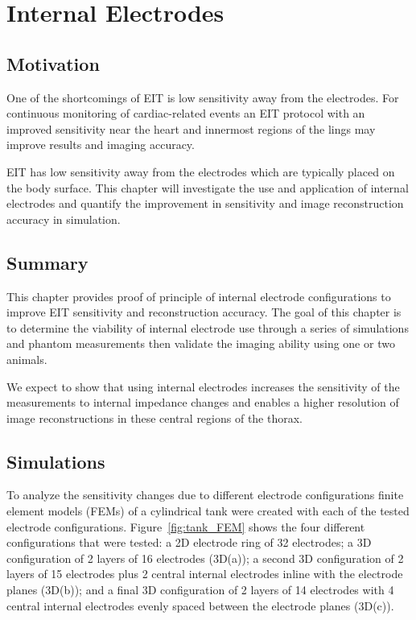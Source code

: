 \chapter{Internal Electrodes}

\section{Motivation}
One of the shortcomings of EIT is low sensitivity away from the electrodes. 
For continuous monitoring of cardiac-related events an EIT protocol with an improved sensitivity 
near the heart and innermost regions of the lings may improve results and imaging accuracy.

EIT has low sensitivity away from the electrodes which are typically placed on the body surface. 
This chapter will investigate the use and application of internal electrodes and quantify the improvement 
in sensitivity and image reconstruction accuracy in simulation.

\section{Summary}
This chapter provides proof of principle of internal electrode configurations to 
improve EIT sensitivity and reconstruction accuracy.
The goal of this chapter is to determine the viability of internal electrode use through a series of simulations and phantom measurements then validate
the imaging ability using one or two animals. 

We expect to show that using internal electrodes increases the sensitivity of the measurements to internal impedance changes 
and enables a higher resolution of image reconstructions in these central regions of the thorax. 

\section{Simulations}
To analyze the sensitivity changes due to different electrode 
configurations finite element models (FEMs) of a cylindrical tank were 
created with each of the tested electrode configurations. Figure~\ref{fig:tank_FEM} shows the four 
different configurations that were tested: a 2D 
electrode ring of 32 electrodes; a 3D configuration of 2 layers of 16 
electrodes (3D(a)); a second 3D configuration of 2 layers of 15 electrodes 
plus 2 central internal electrodes inline with the electrode planes (3D(b)); and a final 3D configuration of 
2 layers of 14 electrodes with 4 central internal electrodes evenly spaced between the electrode planes (3D(c)).

